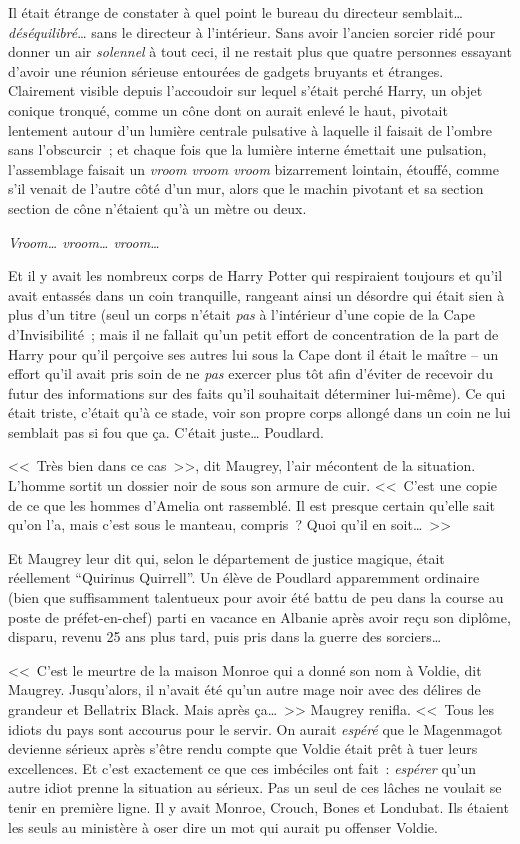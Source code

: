 Il était étrange de constater à quel point le bureau du directeur semblait… \emph{déséquilibré}… sans le directeur à l'intérieur. Sans avoir l'ancien sorcier ridé pour donner un air \emph{solennel} à tout ceci, il ne restait plus que quatre personnes essayant d'avoir une réunion sérieuse entourées de gadgets bruyants et étranges. Clairement visible depuis l'accoudoir sur lequel s'était perché Harry, un objet conique tronqué, comme un cône dont on aurait enlevé le haut, pivotait lentement autour d'un lumière centrale pulsative à laquelle il faisait de l'ombre sans l'obscurcir~; et chaque fois que la lumière interne émettait une pulsation, l'assemblage faisait un \emph{vroom vroom vroom} bizarrement lointain, étouffé, comme s'il venait de l'autre côté d'un mur, alors que le machin pivotant et sa section section de cône n'étaient qu'à un mètre ou deux.

\emph{Vroom… vroom… vroom…}

Et il y avait les nombreux corps de Harry Potter qui respiraient toujours et qu'il avait entassés dans un coin tranquille, rangeant ainsi un désordre qui était sien à plus d'un titre (seul un corps n'était \emph{pas} à l'intérieur d'une copie de la Cape d'Invisibilité~; mais il ne fallait qu'un petit effort de concentration de la part de Harry pour qu'il perçoive ses autres lui sous la Cape dont il était le maître -- un effort qu'il avait pris soin de ne \emph{pas} exercer plus tôt afin d'éviter de recevoir du futur des informations sur des faits qu'il souhaitait déterminer lui-même). Ce qui était triste, c'était qu'à ce stade, voir son propre corps allongé dans un coin ne lui semblait pas si fou que ça. C'était juste… Poudlard.

<<~Très bien dans ce cas~>>, dit Maugrey, l'air mécontent de la situation. L'homme sortit un dossier noir de sous son armure de cuir. <<~C'est une copie de ce que les hommes d'Amelia ont rassemblé. Il est presque certain qu'elle sait qu'on l'a, mais c'est sous le manteau, compris~? Quoi qu'il en soit…~>>

Et Maugrey leur dit qui, selon le département de justice magique, était réellement “Quirinus Quirrell”. Un élève de Poudlard apparemment ordinaire (bien que suffisamment talentueux pour avoir été battu de peu dans la course au poste de préfet-en-chef) parti en vacance en Albanie après avoir reçu son diplôme, disparu, revenu 25 ans plus tard, puis pris dans la guerre des sorciers…

<<~C'est le meurtre de la maison Monroe qui a donné son nom à Voldie, dit Maugrey. Jusqu'alors, il n'avait été qu'un autre mage noir avec des délires de grandeur et Bellatrix Black. Mais après ça…~>> Maugrey renifla. <<~Tous les idiots du pays sont accourus pour le servir. On aurait \emph{espéré} que le Magenmagot devienne sérieux après s'être rendu compte que Voldie était prêt à tuer leurs excellences. Et c'est exactement ce que ces imbéciles ont fait~: \emph{espérer} qu'un autre idiot prenne la situation au sérieux. Pas un seul de ces lâches ne voulait se tenir en première ligne. Il y avait Monroe, Crouch, Bones et Londubat. Ils étaient les seuls au ministère à oser dire un mot qui aurait pu offenser Voldie.

